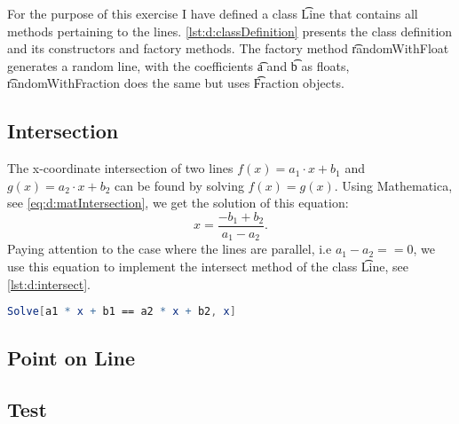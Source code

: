 For the purpose of this exercise I have defined a class \t{Line} that contains all methods pertaining to the lines. \autoref{lst:d:classDefinition} presents the class definition and its constructors and factory methods. The factory method \t{randomWithFloat} generates a random line, with the coefficients \t{a} and \t{b} as floats, \t{randomWithFraction} does the same but uses \t{Fraction} objects.



\subsection*{Intersection}
The x-coordinate intersection of two lines $f(x) = a_1 \cdot x + b_1$ and $g(x) = a_2 \cdot x + b_2$ can be found by solving $f(x) = g(x)$. Using Mathematica, see \autoref{eq:d:matIntersection}, we get the solution of this equation:
\begin{equation}
	x = \frac{-b_1 + b_2}{a_1 - a_2}.
\end{equation}
Paying attention to the case where the lines are parallel, i.e $a_1 - a_2 == 0$, we use this equation to implement the intersect method of the class \t{Line}, see \autoref{lst:d:intersect}.




\begin{lstlisting}[language=Mathematica, float, caption={Mathematica code used to derive an expression for the $x$-coordinate of two lines.}, label={eq:d:matIntersection}]
Solve[a1 * x + b1 == a2 * x + b2, x]
\end{lstlisting}

\subsection*{Point on Line}

\subsection*{Test}